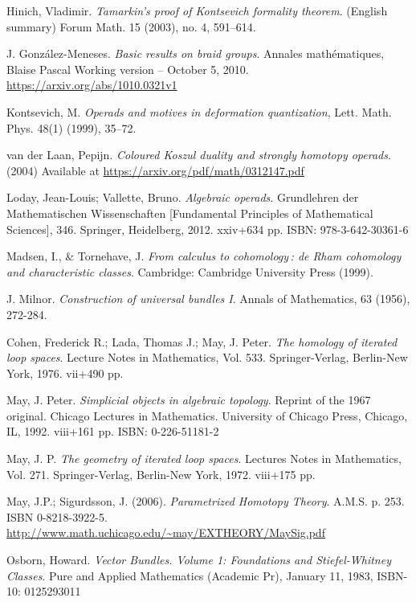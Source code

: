 \documentclass[TFM.tex]{subfiles}
\begin{document}
\begin{thebibliography}{}
 Hinich, Vladimir. \emph{Tamarkin's proof of Kontsevich formality theorem}. (English summary) 
Forum Math. 15 (2003), no. 4, 591–614. 


 J. González-Meneses. \emph{Basic results on braid groups}. Annales mathématiques, Blaise Pascal Working version – October 5, 2010. \url{https://arxiv.org/abs/1010.0321v1}


 Kontsevich, M. \emph{Operads and motives in deformation quantization}, Lett. Math. Phys.
48(1) (1999), 35–72.

 van der Laan, Pepijn. \emph{Coloured Koszul duality and strongly homotopy operads}. (2004) Available at \url{https://arxiv.org/pdf/math/0312147.pdf}

 Loday, Jean-Louis; Vallette, Bruno. \emph{Algebraic operads}. Grundlehren der Mathematischen Wissenschaften [Fundamental Principles of Mathematical Sciences], 346. Springer, Heidelberg, 2012. xxiv+634 pp. ISBN: 978-3-642-30361-6

 Madsen, I., \& Tornehave, J. \emph{From calculus to cohomology : de Rham cohomology and characteristic classes}. Cambridge: Cambridge University Press (1999).

 J. Milnor. \emph{Construction of universal bundles I}. Annals of Mathematics, 63 (1956), 272-284. %


 Cohen, Frederick R.; Lada, Thomas J.; May, J. Peter. \emph{The homology of iterated loop spaces}. Lecture Notes in Mathematics, Vol. 533. Springer-Verlag, Berlin-New York, 1976. vii+490 pp. %


  May, J. Peter. \emph{Simplicial objects in algebraic topology}. Reprint of the 1967 original. Chicago Lectures in Mathematics. University of Chicago Press, Chicago, IL, 1992. viii+161 pp. ISBN: 0-226-51181-2


 May, J. P.
\emph{The geometry of iterated loop spaces}. 
Lectures Notes in Mathematics, Vol. 271. Springer-Verlag, Berlin-New York, 1972. viii+175 pp. 


 May, J.P.; Sigurdsson, J. (2006). \emph{Parametrized Homotopy Theory}. A.M.S. p. 253. ISBN 0-8218-3922-5. \url{http://www.math.uchicago.edu/~may/EXTHEORY/MaySig.pdf}


 Osborn, Howard. \emph{Vector Bundles. Volume 1: Foundations and Stiefel-Whitney Classes}. Pure and Applied Mathematics (Academic Pr), January 11, 1983, ISBN-10: 0125293011



\end{thebibliography}
\end{document}
